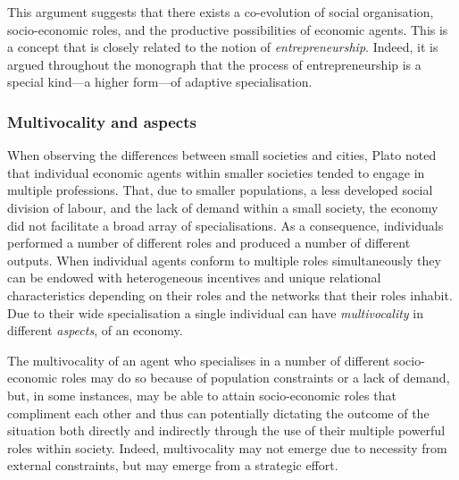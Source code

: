 This argument suggests that there exists a co-evolution of social organisation, socio-economic roles, and the productive possibilities of economic agents. This is a concept that is closely related to the notion of \emph{entrepreneurship}. Indeed, it is argued throughout the monograph that the process of entrepreneurship is a special kind---a higher form---of adaptive specialisation.

\subsubsection{Multivocality and aspects}

When observing the differences between small societies and cities, Plato noted that individual economic agents within smaller societies tended to engage in multiple professions. That, due to smaller populations, a less developed social division of labour, and the lack of demand within a small society, the economy did not facilitate a broad array of specialisations. As a consequence, individuals performed a number of different roles and produced a number of different outputs. When individual agents conform to multiple roles simultaneously they can be endowed with heterogeneous incentives and unique relational characteristics depending on their roles and the networks that their roles inhabit. Due to their wide specialisation a single individual can have \emph{multivocality} in different \emph{aspects}, of an economy.

The multivocality of an agent who specialises in a number of different socio-economic roles may do so because of population constraints or a lack of demand, but, in some instances, may be able to attain socio-economic roles that compliment each other and thus can potentially dictating the outcome of the situation both directly and indirectly through the use of their multiple powerful roles within society. Indeed, multivocality may not emerge due to necessity from external constraints, but may emerge from a strategic effort. 

